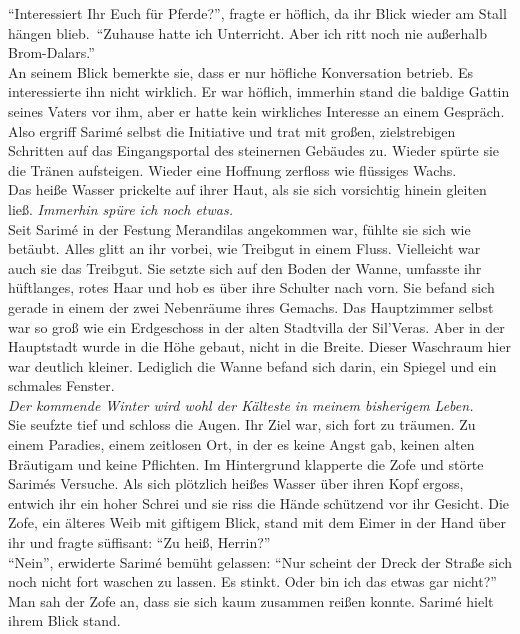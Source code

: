 ``Interessiert Ihr Euch für Pferde?'', fragte er höflich, da ihr Blick wieder am Stall hängen 
blieb.\ 
``Zuhause hatte ich Unterricht. Aber ich ritt noch nie außerhalb Brom-Dalars.''\\
An seinem Blick bemerkte sie, dass er nur höfliche Konversation betrieb. Es interessierte ihn nicht 
wirklich. Er war höflich, immerhin stand die baldige Gattin seines Vaters vor ihm, aber er hatte 
kein wirkliches Interesse an einem Gespräch. Also ergriff Sarimé selbst die Initiative und trat mit 
großen, zielstrebigen Schritten auf das Eingangsportal des steinernen Gebäudes zu. Wieder spürte 
sie die Tränen aufsteigen. Wieder eine Hoffnung zerfloss wie flüssiges Wachs. \\


Das heiße Wasser prickelte auf ihrer Haut, als sie sich vorsichtig hinein gleiten ließ. 
\textit{Immerhin spüre ich noch etwas.}\\
Seit Sarimé in der Festung Merandilas angekommen war, fühlte sie sich wie betäubt. Alles glitt an 
ihr vorbei, wie Treibgut in einem Fluss. Vielleicht war auch sie das Treibgut. Sie setzte sich auf 
den Boden der Wanne, umfasste ihr hüftlanges, rotes Haar und hob es über ihre Schulter nach vorn. 
Sie befand sich gerade in einem der zwei Nebenräume ihres Gemachs. Das Hauptzimmer selbst war so 
groß wie ein Erdgeschoss in der alten Stadtvilla der Sil'Veras. Aber in der Hauptstadt wurde in die 
Höhe gebaut, nicht in die Breite. Dieser Waschraum hier war deutlich kleiner. Lediglich die Wanne 
befand sich darin, ein Spiegel und ein schmales Fenster.\\
\textit{Der kommende Winter wird wohl der Kälteste in meinem bisherigem Leben.}\\
Sie seufzte tief und schloss die Augen. Ihr Ziel war, sich fort zu träumen. Zu einem Paradies, einem 
zeitlosen Ort, in der es keine Angst gab, keinen alten Bräutigam und keine Pflichten. Im Hintergrund 
klapperte die Zofe und störte Sarimés Versuche. Als sich plötzlich heißes Wasser über ihren Kopf 
ergoss, entwich ihr ein hoher Schrei und sie riss die Hände schützend vor ihr Gesicht. Die Zofe, ein 
älteres Weib mit giftigem Blick, stand mit dem Eimer in der Hand über ihr und fragte 
süffisant: ``Zu heiß, Herrin?''\\
``Nein'', erwiderte Sarimé bemüht gelassen: ``Nur scheint der Dreck der Straße sich noch nicht fort 
waschen zu lassen. Es stinkt. Oder bin ich das etwas gar nicht?''\\
Man sah der Zofe an, dass sie sich kaum zusammen reißen konnte. Sarimé hielt ihrem Blick stand. 
